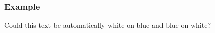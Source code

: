 \documentclass{beamer}
\begin{document}
\begin{frame}
    \frametitle{Example}
    \color{yellow}Could this text be automatically white on blue and blue on white?
\end{frame}
\end{document}
